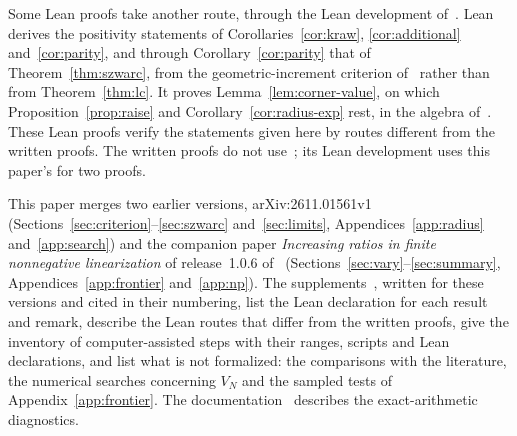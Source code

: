Some Lean proofs take another route, through the Lean development of~\cite{P3}. Lean derives the positivity statements of Corollaries~\ref{cor:kraw}, \ref{cor:additional} and~\ref{cor:parity}, and through Corollary~\ref{cor:parity} that of Theorem~\ref{thm:szwarc}, from the geometric-increment criterion of~\cite{P3} rather than from Theorem~\ref{thm:lc}. It proves Lemma~\ref{lem:corner-value}, on which Proposition~\ref{prop:raise} and Corollary~\ref{cor:radius-exp} rest, in the algebra of~\cite{P3}. These Lean proofs verify the statements given here by routes different from the written proofs. The written proofs do not use~\cite{P3}; its Lean development uses this paper's for two proofs.

This paper merges two earlier versions, arXiv:2611.01561v1 (Sections~\ref{sec:criterion}--\ref{sec:szwarc} and~\ref{sec:limits}, Appendices~\ref{app:radius} and~\ref{app:search}) and the companion paper \emph{Increasing ratios in finite nonnegative linearization} of release~1.0.6 of~\cite{code} (Sections~\ref{sec:vary}--\ref{sec:summary}, Appendices~\ref{app:frontier} and~\ref{app:np}). The supplements~\cite{suppA,suppB}, written for these versions and cited in their numbering, list the Lean declaration for each result and remark, describe the Lean routes that differ from the written proofs, give the inventory of computer-assisted steps with their ranges, scripts and Lean declarations, and list what is not formalized: the comparisons with the literature, the numerical searches concerning $V_N$ and the sampled tests of Appendix~\ref{app:frontier}. The documentation~\cite{docs} describes the exact-arithmetic diagnostics.

